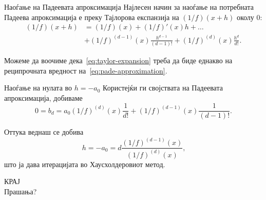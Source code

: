 \documentclass[serif, xcolor={svgnames, table}, usepdftitle=false]{beamer}
\begin{document}
\begin{frame}{Наоѓање на Падеевата апроксимација}
  Најлесен начин за наоѓање на потребната Падеева апроксимација е преку
  Тајлорова експанзија на \((1 / {f})(x + h)\) околу \(0\):
  \begin{equation}\label{eq:taylor-expansion}
    \begin{aligned}
      (1 / {f})(x + h) &= (1 / {f})(x) + (1 / {f})'(x) h + \ldots \\
      &+ {(1 / {f})}^{(d - 1)}(x) \frac{h^{d - 1}}{(d - 1)!} + {(1 / {f})}^{(d)}(x)
      \frac{h^d}{d!}\text{.}
    \end{aligned}
  \end{equation}

  Можеме да воочиме дека~\alert{\eqref{eq:taylor-expansion} треба да биде
    еднакво на реципрочната вредност на~\eqref{eq:pade-approximation}}.
\end{frame}

\begin{frame}{Наоѓање на нулата во \(h = -a_0\)}
  Користејќи ги својствата на Падеевата апроксимација, добиваме
  \[
    0 = b_d = a_0 {(1 / {f})}^{(d)}(x) \frac{1}{d!} + {(1 / {f})}^{(d - 1)}(x)
    \frac{1}{(d - 1)!}\text{.}
  \]

  Оттука веднаш се добива
  \[
    h = -a_0 = d \frac{{(1 / {f})}^{(d - 1)}(x)}{{(1 / {f})}^{(d)}(x)}\text{,}
  \]
  што ја дава итерацијата во Хаусхолдеровиот метод.
\end{frame}

\begin{frame}[plain]
\begin{center}
  {\huge КРАЈ}\\
  Прашања?
\end{center}
\end{frame}
\end{document}

